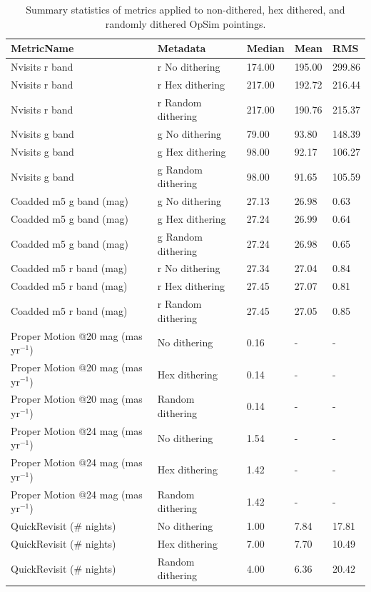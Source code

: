 \documentclass[]{spie}  %
\begin{document}
\begin{table}[]
\caption{Summary statistics of metrics applied to non-dithered,
  hex dithered, and randomly dithered OpSim pointings.}
\label{tab:summarystats}
\begin{center}
\begin{tabular}{|l|l|l|l|l|}
\hline
MetricName &  Metadata &  Median &  Mean &  RMS \\
\hline  
Nvisits r band &  r No dithering & 174.00 & 195.00 & 299.86\\  
Nvisits r band &  r Hex dithering & 217.00 & 192.72 & 216.44\\  
Nvisits r band &  r Random dithering & 217.00 & 190.76 & 215.37\\ 
\hline  
Nvisits g band &  g No dithering & 79.00 & 93.80 & 148.39\\ 
Nvisits g band &  g Hex dithering & 98.00 & 92.17 & 106.27\\ 
Nvisits g band &  g Random dithering & 98.00 & 91.65 & 105.59\\ 
\hline  
Coadded m5 g band (mag) &  g No dithering & 27.13 & 26.98 & 0.63\\
Coadded m5 g band (mag) &  g Hex dithering & 27.24 & 26.99 & 0.64\\  
Coadded m5 g band (mag) &  g Random dithering & 27.24 & 26.98 & 0.65\\ 
\hline                  
Coadded m5 r band (mag) &  r No dithering & 27.34 & 27.04 & 0.84\\  
Coadded m5 r band (mag) &  r Hex dithering & 27.45 & 27.07 & 0.81\\  
Coadded m5 r band (mag) &  r Random dithering & 27.45 & 27.05 & 0.85\\
\hline  
Proper Motion @20 mag  (mas yr$^{-1}$)&   No dithering & 0.16 & - & - \\ 
Proper Motion @20 mag  (mas yr$^{-1}$)&   Hex dithering & 0.14 & - &  - \\
Proper Motion @20 mag  (mas yr$^{-1}$)&   Random dithering & 0.14 & - & -\\ 
\hline                                
Proper Motion @24 mag  (mas yr$^{-1}$)&   No dithering & 1.54 & -  & - \\
Proper Motion @24 mag  (mas yr$^{-1}$)&   Hex dithering & 1.42 & - & - \\
Proper Motion @24 mag  (mas yr$^{-1}$)&   Random dithering & 1.42 &-  & - \\
\hline  
QuickRevisit  (\# nights) &   No dithering & 1.00 & 7.84 & 17.81\\ 
QuickRevisit  (\# nights) &   Hex dithering & 7.00 & 7.70 & 10.49\\ 
QuickRevisit  (\# nights) &   Random dithering & 4.00 & 6.36 & 20.42\\ 
\hline 
\end{tabular}
\end{center}
\end{table}
\end{document}

